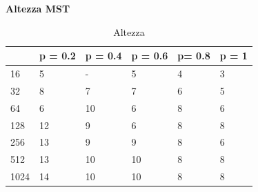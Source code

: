 \documentclass[]{article}
\begin{document}
\textbf{Altezza MST}\\
\begin{table}[H]
\centering
\caption{Altezza}
\label{tab:mst_height}
\begin{tabular}{|l|l|l|l|l|l|} 
\cline{2-6}
\multicolumn{1}{l|}{} & p = 0.2 & p = 0.4 & p = 0.6 & p= 0.8 & p = 1  \\ 
\hline
16                    & 5       & -       & 5       & 4      & 3      \\
32                    & 8       & 7       & 7       & 6      & 5      \\
64                    & 6       & 10      & 6       & 8      & 6      \\
128                   & 12      & 9       & 6       & 8      & 8      \\
256                   & 13      & 9       & 9       & 8      & 6      \\
512                   & 13      & 10      & 10      & 8      & 8      \\
1024                  & 14      & 10      & 10      & 8      & 8      \\
\hline
\end{tabular}
\end{table}
\end{document}
